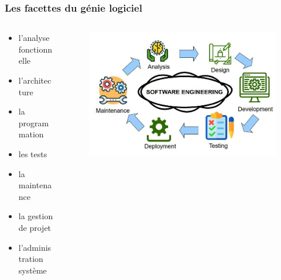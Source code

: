 \begin{frame}
    \frametitle{Les facettes du génie logiciel}

    \begin{columns}
        \begin{column}{0.4\textwidth}
            \begin{itemize}
                \item l'analyse fonctionnelle
                \item l'architecture
                \item la programmation
                \item les tests
                \item la maintenance
                \item la gestion de projet
                \item l'administration système
            \end{itemize}
        \end{column}
        \begin{column}{0.6\textwidth}
            \begin{figure}
                \centering
                \includegraphics[width=\textwidth]{figures/introduction/software-engineering}
                \label{fig:engineering}
            \end{figure}
        \end{column}
    \end{columns}
\end{frame}

